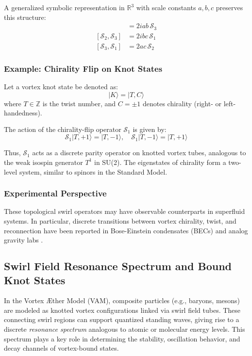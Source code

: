 A generalized symbolic representation in $\mathbb{R}^3$ with scale constants $a, b, c$ preserves this structure:
\begin{align}
[\mathcal{S}_1, \mathcal{S}_2] &= 2iab \, \mathcal{S}_3 \\
[\mathcal{S}_2, \mathcal{S}_3] &= 2ibc \, \mathcal{S}_1 \\
[\mathcal{S}_3, \mathcal{S}_1] &= 2ac \, \mathcal{S}_2
\end{align}

\subsubsection*{Example: Chirality Flip on Knot States}

Let a vortex knot state be denoted as:
\[
|K\rangle = |T, C\rangle
\]
where \( T \in \mathbb{Z} \) is the twist number, and \( C = \pm 1 \) denotes chirality (right- or left-handedness).

The action of the chirality-flip operator \( \mathcal{S}_1 \) is given by:
\[
\mathcal{S}_1 |T, +1\rangle = |T, -1\rangle, \quad
\mathcal{S}_1 |T, -1\rangle = |T, +1\rangle
\]

Thus, \( \mathcal{S}_1 \) acts as a discrete parity operator on knotted vortex tubes, analogous to the weak isospin generator \( T^1 \) in SU(2). The eigenstates of chirality form a two-level system, similar to spinors in the Standard Model.

\subsubsection*{Experimental Perspective}

These topological swirl operators may have observable counterparts in superfluid systems. In particular, discrete transitions between vortex chirality, twist, and reconnection have been reported in Bose-Einstein condensates (BECs) and analog gravity labs \cite{kleckner2013creation,ray2015observation}.

\subsection{Swirl Field Resonance Spectrum and Bound Knot States}

In the Vortex Æther Model (VAM), composite particles (e.g., baryons, mesons) are modeled as knotted vortex configurations linked via swirl field tubes. These connecting swirl regions can support quantized standing waves, giving rise to a discrete \textit{resonance spectrum} analogous to atomic or molecular energy levels. This spectrum plays a key role in determining the stability, oscillation behavior, and decay channels of vortex-bound states.


